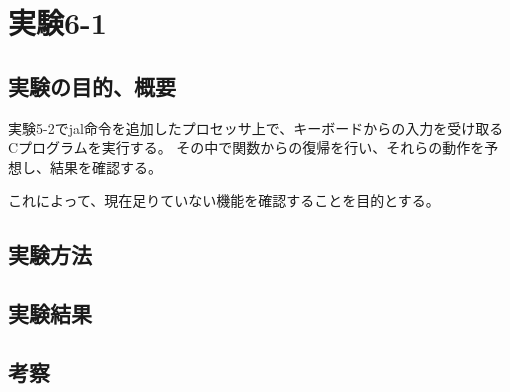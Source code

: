 \section{実験6-1}
\subsection{実験の目的、概要}
実験5-2でjal命令を追加したプロセッサ上で、キーボードからの入力を受け取るCプログラムを実行する。
その中で関数からの復帰を行い、それらの動作を予想し、結果を確認する。

これによって、現在足りていない機能を確認することを目的とする。

\subsection{実験方法}

\subsection{実験結果}

\subsection{考察}
